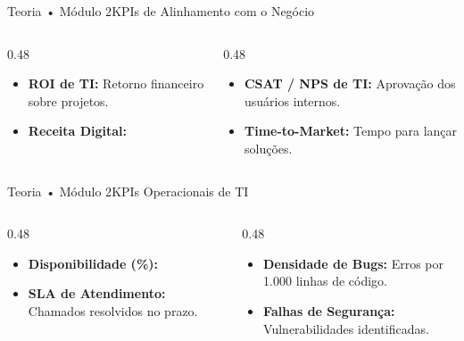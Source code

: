 \begin{senaiframe}{Teoria • Módulo 2}{KPIs de Alinhamento com o Negócio}
  \begin{columns}[t]
    \begin{column}{0.48\textwidth}
      \begin{tcolorbox}[senaibluecard, title={ROI \& Receita}]
        \begin{itemize}
          \item \textbf{ROI de TI:} Retorno financeiro sobre projetos.
          \item \textbf{Receita Digital:} %
        \end{itemize}
      \end{tcolorbox}
    \end{column}
    \begin{column}{0.48\textwidth}
      \begin{tcolorbox}[senaigreencard, title={Satisfação \& Agilidade}]
        \begin{itemize}
          \item \textbf{CSAT / NPS de TI:} Aprovação dos usuários internos.
          \item \textbf{Time-to-Market:} Tempo para lançar soluções.
        \end{itemize}
      \end{tcolorbox}
    \end{column}
  \end{columns}
\end{senaiframe}

\begin{senaiframe}{Teoria • Módulo 2}{KPIs Operacionais de TI}
  \begin{columns}[t]
    \begin{column}{0.48\textwidth}
      \begin{tcolorbox}[senaibluecard, title={Uptime \& SLAs}]
        \begin{itemize}
          \item \textbf{Disponibilidade (\%):} %
          \item \textbf{SLA de Atendimento:} Chamados resolvidos no prazo.
        \end{itemize}
      \end{tcolorbox}
    \end{column}
    \begin{column}{0.48\textwidth}
      \begin{tcolorbox}[senairedcard, title={Qualidade de Código}]
        \begin{itemize}
          \item \textbf{Densidade de Bugs:} Erros por 1.000 linhas de código.
          \item \textbf{Falhas de Segurança:} Vulnerabilidades identificadas.
        \end{itemize}
      \end{tcolorbox}
    \end{column}
  \end{columns}
\end{senaiframe}

